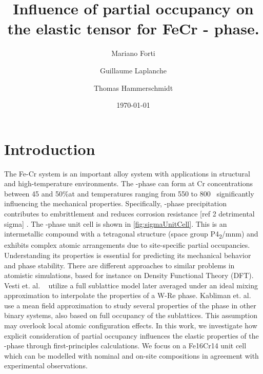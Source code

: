 \documentclass[superscriptaddress, 12pt]{revtex4-2}%
\date{}
\begin{document}
\title{Influence of partial occupancy on the elastic tensor for FeCr \textsigma - phase.}

\author{Mariano Forti} 

\author{Guillaume Laplanche} \email{}

\author{Thomas Hammerschmidt} \email{}

\date{\today}

\maketitle

\section{Introduction}

The Fe-Cr system is an important alloy system with applications in structural and high-temperature environments.
The \textsigma-phase can form at Cr concentrations between 45 and 50\%at and temperatures ranging from 550 to 800\textdegree ~\cite{laplanche_phase_2018} significantly influencing the mechanical properties.
Specifically, \textsigma-phase precipitation contributes to embrittlement and reduces corrosion resistance {\color{red}  [ref 2 detrimental sigma] }.
The \textsigma-phase unit cell is shown in \autoref{fig:sigmaUnitCell}.
This is an intermetallic compound with a tetragonal structure (space group P4\textsubscript{2}/mnm) and exhibits complex atomic arrangements due to site-specific partial occupancies.
Understanding its properties is essential for predicting its mechanical behavior and phase stability.
There are different approaches to similar problems in atomistic simulations, based for instance on Density Functional Theory (DFT).
Vesti et. al. ~\cite{vesti_ab-initio_2023} utilize a full sublattice model later averaged under an ideal mixing approximation to interpolate the properties of a W-Re \textsigma phase.
Kabliman et. al. ~\cite{kabliman_ab_2012} use a mean field approximation to study several properties of the \textsigma phase in other binary systems, also based on full occupancy of the sublattices.
This assumption may overlook local atomic configuration effects.
In this work, we investigate how explicit consideration of partial occupancy influences the elastic properties of the \textsigma-phase through first-principles calculations.
We focus on a Fe16Cr14 unit cell which can be modelled with nominal and on-site compositions in agreement with experimental observations.
\end{document}
